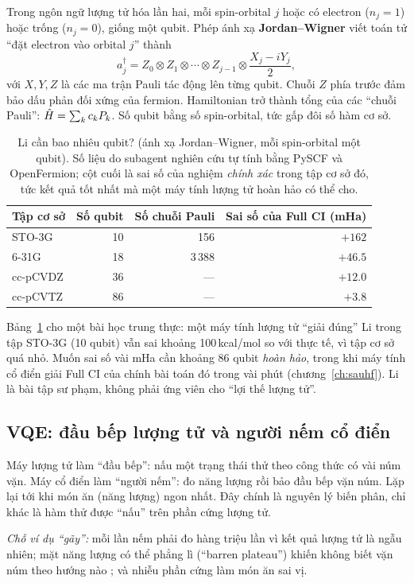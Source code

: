 \begin{congthuc}
Trong ngôn ngữ lượng tử hóa lần hai, mỗi spin-orbital $j$ hoặc có electron ($n_j=1$) hoặc trống ($n_j=0$), giống một qubit. Phép ánh xạ \textbf{Jordan--Wigner} \cite{JordanWigner1928} viết toán tử ``đặt electron vào orbital $j$'' thành
\[
a_j^\dagger=Z_0\otimes Z_1\otimes\cdots\otimes Z_{j-1}\otimes\frac{X_j-iY_j}{2},
\]
với $X,Y,Z$ là các ma trận Pauli tác động lên từng qubit. Chuỗi $Z$ phía trước đảm bảo dấu phản đối xứng của fermion. Hamiltonian trở thành tổng của các ``chuỗi Pauli'': $\hat H=\sum_kc_kP_k$. Số qubit bằng số spin-orbital, tức gấp đôi số hàm cơ sở.
\end{congthuc}

\begin{table}[h]
\centering\small
\caption{Li cần bao nhiêu qubit? (ánh xạ Jordan--Wigner, mỗi spin-orbital một qubit). Số liệu do subagent nghiên cứu tự tính bằng PySCF và OpenFermion; cột cuối là sai số của nghiệm \emph{chính xác} trong tập cơ sở đó, tức kết quả tốt nhất mà một máy tính lượng tử hoàn hảo có thể cho.}
\label{tab:qubit}
\begin{tabular}{@{}lrrr@{}}
\toprule
Tập cơ sở & Số qubit & Số chuỗi Pauli & Sai số của Full CI (mHa) \\
\midrule
STO-3G & 10 & 156 & $+162$ \\
6-31G & 18 & 3\,388 & $+46.5$ \\
cc-pCVDZ & 36 & --- & $+12.0$ \\
cc-pCVTZ & 86 & --- & $+3.8$ \\
\bottomrule
\end{tabular}
\end{table}

Bảng~\ref{tab:qubit} cho một bài học trung thực: một máy tính lượng tử ``giải đúng'' Li trong tập STO-3G (10 qubit) vẫn sai khoảng 100\,kcal/mol so với thực tế, vì tập cơ sở quá nhỏ. Muốn sai số vài mHa cần khoảng 86 qubit \emph{hoàn hảo}, trong khi máy tính cổ điển giải Full CI của chính bài toán đó trong vài phút (chương~\ref{ch:sauhf}). Li là bài tập sư phạm, không phải ứng viên cho ``lợi thế lượng tử''.

\subsection{VQE: đầu bếp lượng tử và người nếm cổ điển}

\begin{eli5}
Máy lượng tử làm ``đầu bếp'': nấu một trạng thái thử theo công thức có vài núm vặn. Máy cổ điển làm ``người nếm'': đo năng lượng rồi bảo đầu bếp vặn núm. Lặp lại tới khi món ăn (năng lượng) ngon nhất. Đây chính là nguyên lý biến phân, chỉ khác là hàm thử được ``nấu'' trên phần cứng lượng tử.

\emph{Chỗ ví dụ ``gãy'':} mỗi lần nếm phải đo hàng triệu lần vì kết quả lượng tử là ngẫu nhiên; mặt năng lượng có thể phẳng lì (``barren plateau'') khiến không biết vặn núm theo hướng nào \cite{McClean2018}; và nhiễu phần cứng làm món ăn sai vị.
\end{eli5}

